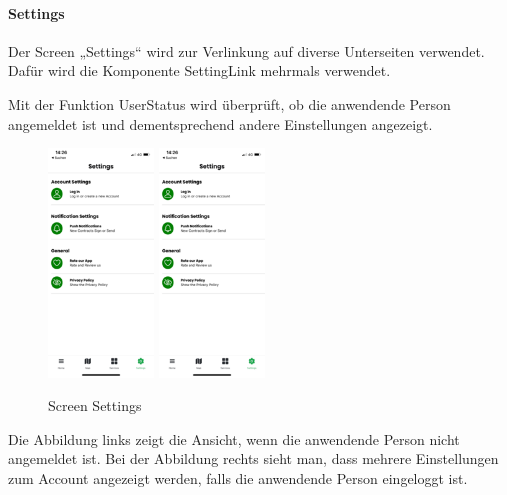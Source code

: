 \bigskip


\paragraph{Settings}Der Screen „Settings“ wird zur Verlinkung auf diverse Unterseiten verwendet. Dafür wird die Komponente SettingLink mehrmals verwendet.

\noindent Mit der Funktion UserStatus wird überprüft, ob die anwendende Person angemeldet ist und dementsprechend andere Einstellungen angezeigt.

\begin{figure}[H]
  \centering
  \includegraphics[width=0.25\textwidth]{images/app-screenshots/screensettingsa.png}
  \includegraphics[width=0.25\textwidth]{images/app-screenshots/screensettingsa.png}
  \caption{Screen Settings}
  \label{fig:screensettings}
\end{figure}
Die Abbildung links zeigt die Ansicht, wenn die anwendende Person nicht angemeldet ist. Bei der Abbildung rechts sieht man, dass mehrere Einstellungen zum Account angezeigt werden, falls die anwendende Person eingeloggt ist.

\bigskip


